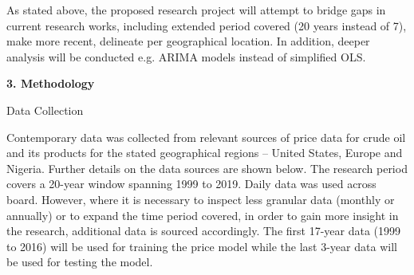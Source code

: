 \documentclass[12pt,twoside]{article}
\begin{document}
{\fontsize{11pt}{13.2pt}\selectfont \par}
\par

\begin{justify}
{\fontsize{11pt}{13.2pt}\selectfont As stated above, the proposed research project will attempt to bridge gaps in current research works, including extended period covered (20 years instead of 7), make more recent, delineate per geographical location. In addition, deeper analysis will be conducted e.g. ARIMA models instead of simplified OLS. \par}
\end{justify}\par

\begin{justify}
{\fontsize{11pt}{13.2pt}\selectfont \par}
\end{justify}
\vspace{\baselineskip}{\fontsize{11pt}{13.2pt}\selectfont \par}
\vspace{\baselineskip}\begin{justify}
{\fontsize{13pt}{15.6pt}\selectfont \textbf{3. Methodology}\par}
\end{justify}\par

{\fontsize{11pt}{13.2pt}\selectfont \par}
\par

\begin{justify}
{\fontsize{11pt}{13.2pt}\selectfont Data Collection\par}
\end{justify}\par

\begin{justify}
{\fontsize{11pt}{13.2pt}\selectfont Contemporary data was collected from relevant sources of price data for crude oil and its products for the stated geographical regions – United States, Europe and Nigeria. Further details on the data sources are shown below. The research period covers a 20-year window spanning 1999 to 2019. Daily data was used across board. However, where it is necessary to inspect less granular data (monthly or annually) or to expand the time period covered, in order to gain more insight in the research, additional data is sourced accordingly. The first 17-year data (1999 to 2016) will be used for training the price model while the last 3-year data will be used for testing the model.\par}
\end{justify}\par
\end{document}
